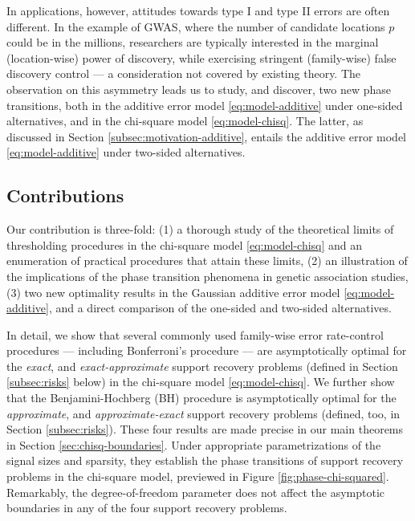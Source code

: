 In applications, however, attitudes towards type I and type II errors are often different.
In the example of GWAS, where the number of candidate locations $p$ could be in the millions, researchers are typically interested in the marginal (location-wise) power of discovery, while exercising stringent (family-wise) false discovery control --- a consideration not covered by existing theory.
The observation on this asymmetry leads us to study, and discover, two new phase transitions, both in the additive error model \eqref{eq:model-additive} under one-sided alternatives, and in the chi-square model \eqref{eq:model-chisq}.
The latter, as discussed in Section \ref{subsec:motivation-additive}, entails the additive error model \eqref{eq:model-additive} under two-sided alternatives.

\subsection{Contributions}

Our contribution is three-fold: (1) a thorough study of the theoretical limits of thresholding procedures in the chi-square model \eqref{eq:model-chisq} and an enumeration of practical procedures that attain these limits, 
(2) an illustration of the implications of the phase transition phenomena in genetic association studies,
(3) two new optimality results in the Gaussian additive error model \eqref{eq:model-additive}, and a direct comparison of the one-sided and two-sided alternatives. 

In detail, we show that several commonly used family-wise error rate-control procedures --- including Bonferroni's procedure \cite{dunn1961multiple} --- are asymptotically optimal for the \emph{exact}, and \emph{exact-approximate} support recovery problems (defined in Section \ref{subsec:risks} below) in the chi-square model \eqref{eq:model-chisq}.
We further show that the Benjamini-Hochberg (BH) procedure \cite{benjamini1995controlling} is asymptotically optimal for the \emph{approximate}, and \emph{approximate-exact} support recovery problems (defined, too, in Section \ref{subsec:risks}).
These four results are made precise in our main theorems in Section \ref{sec:chisq-boundaries}.
Under appropriate parametrizations of the signal sizes and sparsity, they establish the phase transitions of support recovery problems in the chi-square model, previewed in Figure \ref{fig:phase-chi-squared}.
Remarkably, the degree-of-freedom parameter does not affect the asymptotic boundaries in any of the four support recovery problems.

